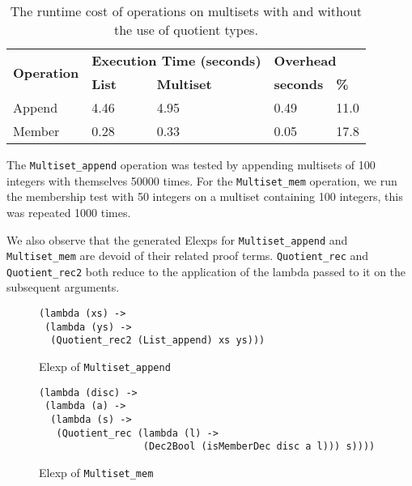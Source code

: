 \documentclass[12pt,twoside,maitrise]{dms}
\theoremstyle{definition}
\numberwithin{equation}{section}
\numberwithin{table}{chapter}
\numberwithin{figure}{chapter}
\newcommand\id[1] {\texttt{#1}}
\begin{document}
\begin{table}[H]
\centering
\begin{tabular}{@{}lllll@{}}
\toprule
\multirow{2}{*}{\textbf{Operation}} & \multicolumn{2}{l}{\textbf{Execution Time (seconds)}} & \multicolumn{2}{l}{\textbf{Overhead}} \\ \cmidrule(l){2-5}
       & \textbf{List} & \textbf{Multiset} & \textbf{seconds} & \textbf{\%} \\ \midrule
Append & 4.46          & 4.95              & 0.49             & 11.0        \\
Member & 0.28          & 0.33              & 0.05             & 17.8        \\ \bottomrule
\end{tabular}
\caption{The runtime cost of operations on multisets with and without the use of quotient types.}
\label{tab:benchmark-multiset}
\end{table}

The \id{Multiset\_append} operation was tested by appending multisets of 100
integers with themselves 50000 times. For the \id{Multiset\_mem} operation, we
run the membership test with 50 integers on a multiset containing 100 integers,
this was repeated 1000 times.


We also observe that the generated Elexps for \id{Multiset\_append} and
\id{Multiset\_mem} are devoid of their related proof terms. \id{Quotient\_rec}
and \id{Quotient\_rec2} both reduce to the application of the lambda passed to
it on the subsequent arguments.

\begin{figure}[H]
\begin{verbatim}
(lambda (xs) ->
 (lambda (ys) ->
  (Quotient_rec2 (List_append) xs ys)))
\end{verbatim}
\caption{Elexp of \id{Multiset\_append}}
\end{figure}

\begin{figure}[H]
\begin{verbatim}
(lambda (disc) ->
 (lambda (a) ->
  (lambda (s) ->
   (Quotient_rec (lambda (l) ->
                  (Dec2Bool (isMemberDec disc a l))) s))))
\end{verbatim}
\caption{Elexp of \id{Multiset\_mem}}
\end{figure}
\end{document}

